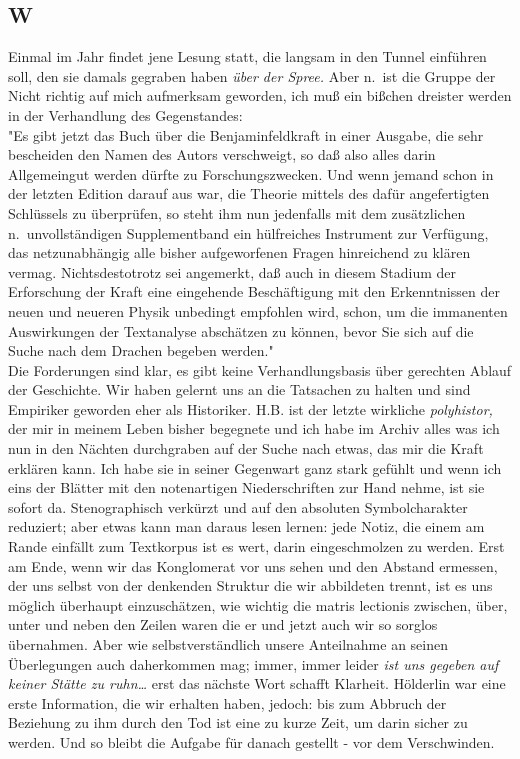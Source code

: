 \documentclass[
]{article}
\author{}
\date{\vspace{-2.5em}}
\begin{document}
\subsection{W}\label{w}

Einmal im Jahr findet jene Lesung statt, die langsam in den Tunnel
einführen soll, den sie damals gegraben haben \emph{über der Spree.}
Aber n.~ist die Gruppe der Nicht richtig auf mich aufmerksam geworden,
ich muß ein bißchen dreister werden in der Verhandlung des
Gegenstandes:\\
"Es gibt jetzt das Buch über die Benjaminfeldkraft in einer Ausgabe, die
sehr bescheiden den Namen des Autors verschweigt, so daß also alles
darin Allgemeingut werden dürfte zu Forschungszwecken. Und wenn jemand
schon in der letzten Edition darauf aus war, die Theorie mittels des
dafür angefertigten Schlüssels zu überprüfen, so steht ihm nun
jedenfalls mit dem zusätzlichen n.~unvollständigen Supplementband ein
hülfreiches Instrument zur Verfügung, das netzunabhängig alle bisher
aufgeworfenen Fragen hinreichend zu klären vermag. Nichtsdestotrotz sei
angemerkt, daß auch in diesem Stadium der Erforschung der Kraft eine
eingehende Beschäftigung mit den Erkenntnissen der neuen und neueren
Physik unbedingt empfohlen wird, schon, um die immanenten Auswirkungen
der Textanalyse abschätzen zu können, bevor Sie sich auf die Suche nach
dem Drachen begeben werden."\\
Die Forderungen sind klar, es gibt keine Verhandlungsbasis über
gerechten Ablauf der Geschichte. Wir haben gelernt uns an die Tatsachen
zu halten und sind Empiriker geworden eher als Historiker. H.B. ist der
letzte wirkliche \emph{polyhistor, }der mir in meinem Leben bisher
begegnete und ich habe im Archiv alles was ich nun in den Nächten
durchgraben auf der Suche nach etwas, das mir die Kraft erklären kann.
Ich habe sie in seiner Gegenwart ganz stark gefühlt und wenn ich eins
der Blätter mit den notenartigen Niederschriften zur Hand nehme, ist sie
sofort da. Stenographisch verkürzt und auf den absoluten Symbolcharakter
reduziert; aber etwas kann man daraus lesen lernen: jede Notiz, die
einem am Rande einfällt zum Textkorpus ist es wert, darin eingeschmolzen
zu werden. Erst am Ende, wenn wir das Konglomerat vor uns sehen und den
Abstand ermessen, der uns selbst von der denkenden Struktur die wir
abbildeten trennt, ist es uns möglich überhaupt einzuschätzen, wie
wichtig die matris lectionis zwischen, über, unter und neben den Zeilen
waren die er und jetzt auch wir so sorglos übernahmen. Aber wie
selbstverständlich unsere Anteilnahme an seinen Überlegungen auch
daherkommen mag; immer, immer leider \emph{ist uns gegeben auf keiner
Stätte zu ruhn\ldots{}} erst das nächste Wort schafft Klarheit.
Hölderlin war eine erste Information, die wir erhalten haben, jedoch:
bis zum Abbruch der Beziehung zu ihm durch den Tod ist eine zu kurze
Zeit, um darin sicher zu werden. Und so bleibt die Aufgabe für danach
gestellt - vor dem Verschwinden.
\end{document}
